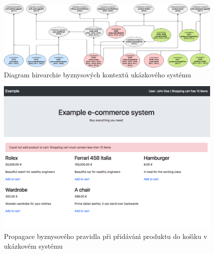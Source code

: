 \begin{figure}
    \centering
    \includegraphics[keepaspectratio=true, width=\linewidth]{figures/example-system-context-hierarchy.pdf}
    \caption{Diagram hirearchie byznysov\'ych kontextů ukázkového systému}
    \label{fig:example-system-context-hirearchy}
\end{figure}

\begin{figure}
    \centering
    \includegraphics[width=0.9\linewidth]{figures/add-product-to-cart-fail.png}
    \caption{Propagace byznysového pravidla při přidáván\'{\i} produktu do koš\'{\i}ku v ukázkovém systému}
    \label{fig:example-screenshot}
\end{figure}
